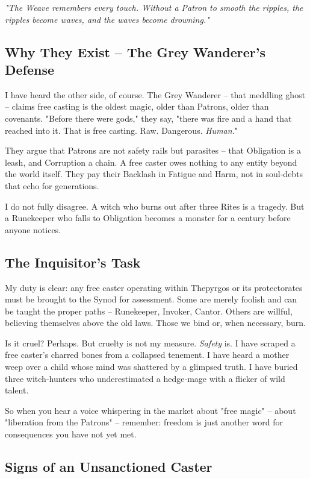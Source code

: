 \documentclass[10pt,a5paper]{book}
\begin{document}
\textit{"The Weave remembers every touch. Without a Patron to smooth the ripples, the ripples become waves, and the waves become drowning."}

\subsection{Why They Exist -- The Grey Wanderer's Defense}

I have heard the other side, of course. The Grey Wanderer -- that meddling ghost -- claims free casting is the oldest magic, older than Patrons, older than covenants. "Before there were gods," they say, "there was fire and a hand that reached into it. That is free casting. Raw. Dangerous. \textit{Human}."

They argue that Patrons are not safety rails but parasites -- that Obligation is a leash, and Corruption a chain. A free caster owes nothing to any entity beyond the world itself. They pay their Backlash in Fatigue and Harm, not in soul‑debts that echo for generations.

I do not fully disagree. A witch who burns out after three Rites is a tragedy. But a Runekeeper who falls to Obligation becomes a monster for a century before anyone notices.

\subsection{The Inquisitor's Task}

My duty is clear: any free caster operating within Thepyrgos or its protectorates must be brought to the Synod for assessment. Some are merely foolish and can be taught the proper paths -- Runekeeper, Invoker, Cantor. Others are willful, believing themselves above the old laws. Those we bind or, when necessary, burn.

Is it cruel? Perhaps. But cruelty is not my measure. \textit{Safety} is. I have scraped a free caster's charred bones from a collapsed tenement. I have heard a mother weep over a child whose mind was shattered by a glimpsed truth. I have buried three witch‑hunters who underestimated a hedge‑mage with a flicker of wild talent.

So when you hear a voice whispering in the market about "free magic" -- about "liberation from the Patrons" -- remember: freedom is just another word for consequences you have not yet met.

\subsection{Signs of an Unsanctioned Caster}
\end{document}
